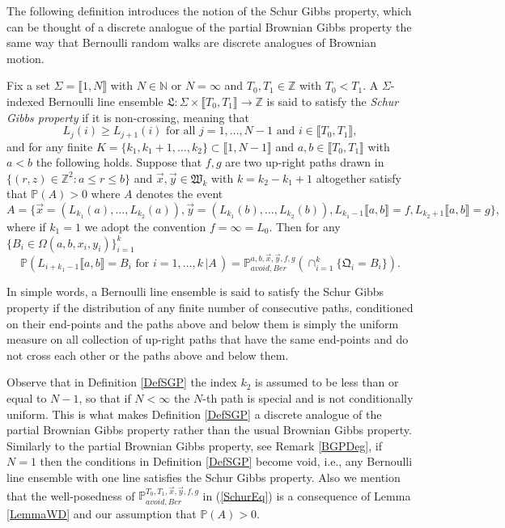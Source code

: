 The following definition introduces the notion of the Schur Gibbs property, which can be thought of a discrete analogue of the partial Brownian Gibbs property the same way that Bernoulli random walks are discrete analogues of Brownian motion. 
\begin{definition}\label{DefSGP}
Fix a set $\Sigma = \llbracket 1, N \rrbracket$ with $N \in \mathbb{N}$ or $N = \infty$ and $T_0, T_1\in \mathbb{Z}$ with $T_0 < T_1$. A $\Sigma$-indexed Bernoulli line ensemble $\mathfrak{L} : \Sigma \times \llbracket T_0, T_1 \rrbracket \rightarrow \mathbb{Z}$ is said to satisfy the {\em Schur Gibbs property} if it is non-crossing, meaning that 
$$ L_j(i) \geq L_{j+1}(i) \mbox{ for all $j = 1, \dots, N-1$ and $i \in \llbracket T_0, T_1 \rrbracket$},$$
and for any finite $K = \{k_1, k_1 + 1, \dots, k_2 \} \subset \llbracket 1, N - 1 \rrbracket$ and $a,b \in \llbracket T_0, T_1 \rrbracket$ with $a < b$ the following holds.  Suppose that $f, g$ are two up-right paths drawn in $\{ (r,z) \in \mathbb{Z}^2 : a \leq r \leq b\}$ and $\vec{x}, \vec{y} \in \mathfrak{W}_k$ with $k=k_2-k_1+1$ altogether satisfy that $\mathbb{P}(A) > 0$ where $A$ denotes the event $$A =\{ \vec{x} = ({L}_{k_1}(a), \dots, {L}_{k_2}(a)), \vec{y} = ({L}_{k_1}(b), \dots, {L}_{k_2}(b)), L_{k_1-1} \llbracket a,b \rrbracket = f, L_{k_2+1} \llbracket a,b \rrbracket = g \},$$
where if $k_1 = 1$ we adopt the convention $f = \infty = L_0$. Then for any $\{ B_i \in \Omega(a, b, x_i , y_i) \}_{i = 1}^k$ 
\begin{equation}\label{SchurEq}
\mathbb{P}\left( L_{i + k_1-1}\llbracket a,b \rrbracket = B_{i} \mbox{ for $i = 1, \dots, k$} \, \vert  A \, \right) = \mathbb{P}_{avoid, Ber}^{a,b, \vec{x}, \vec{y}, f, g} \left( \cap_{i = 1}^k\{ \mathfrak{Q}_i = B_i \} \right).
\end{equation}
\end{definition}
\begin{remark}\label{RemSGB} In simple words, a Bernoulli line ensemble is said to satisfy the Schur Gibbs property if the distribution of any finite number of consecutive paths, conditioned on their end-points and the paths above and below them is simply the uniform measure on all collection of up-right paths that have the same end-points and do not cross each other or the paths above and below them. 
\end{remark}

\begin{remark}\label{RemSGB2} Observe that in Definition \ref{DefSGP} the index $k_2$ is assumed to be less than or equal to $N-1$, so that if $N < \infty$ the $N$-th path is special and is not conditionally uniform. This is what makes Definition \ref{DefSGP} a discrete analogue of the partial Brownian Gibbs property rather than the usual Brownian Gibbs property. Similarly to the partial Brownian Gibbs property, see Remark \ref{BGPDeg}, if $N = 1$ then the conditions in Definition \ref{DefSGP} become void, i.e., any Bernoulli line ensemble with one line satisfies the Schur Gibbs property. Also we mention that the well-posedness of $\mathbb{P}_{avoid, Ber}^{T_0,T_1, \vec{x}, \vec{y}, f, g}$ in (\ref{SchurEq}) is a consequence of Lemma \ref{LemmaWD} and our assumption that $\mathbb{P}(A) > 0$.
\end{remark}

